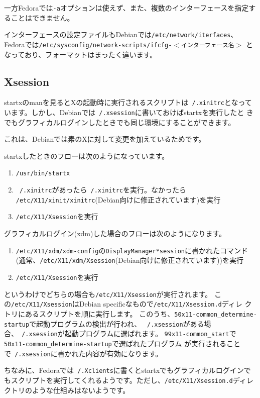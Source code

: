 \documentclass[mingoth,a4paper]{jsarticle}
\begin{document}
一方Fedoraでは\texttt{-a}オプションは使えず、また、複数のインターフェースを指定す
ることはできません。

インターフェースの設定ファイルもDebianでは\texttt{/etc/network/iterfaces}、
Fedoraでは\texttt{/etc/sysconfig/network-scripts/ifcfg-$<$インターフェース名$>$}
となっており、フォーマットはまったく違います。

\subsection{Xsession}

startxのmanを見るとXの起動時に実行されるスクリプトは\texttt{~/.xinitrc}となって
います。しかし、Debianでは\texttt{~/.xsession}に書いておけばstartxを実行したと
きでもグラフィカルログインしたときでも同じ環境にすることができます。

これは、Debianでは素のXに対して変更を加えているためです。

startxしたときのフローは次のようになっています。
\begin{enumerate}
\item \texttt{/usr/bin/startx}
\item \texttt{~/.xinitrc}があったら\texttt{~/.xinitrc}を実行。なかったら
	  \texttt{/etc/X11/xinit/xinitrc}(Debian向けに修正されています)を実行
\item \texttt{/etc/X11/Xsession}を実行
\end{enumerate}

グラフィカルログイン(xdm)した場合のフローは次のようになります。
\begin{enumerate}
\item \texttt{/etc/X11/xdm/xdm-config}の\texttt{DisplayManager*session}に書かれたコマンド
	  (通常、\texttt{/etc/X11/xdm/Xsession}(Debian向けに修正されています))を実行
\item \texttt{/etc/X11/Xsession}を実行
\end{enumerate}

というわけでどちらの場合も\texttt{/etc/X11/Xsession}が実行されます。
この\texttt{/etc/X11/Xsession}はDebian specificなもので\texttt{/etc/X11/Xsession.d}ディレ
クトリにあるスクリプトを順に実行します。
このうち、\texttt{50x11-common\_determine-startup}で起動プログラムの検出が行われ、
\texttt{~/.xsession}がある場合、\texttt{~/.xsession}が起動プログラムに選ばれます。
\texttt{99x11-common\_start}で\texttt{50x11-common\_determine-startup}で選ばれたプログラム
が実行されることで\texttt{~/.xsession}に書かれた内容が有効になります。

ちなみに、Fedoraでは\texttt{~/.Xclients}に書くとstartxでもグラフィカルログインで
もスクリプトを実行してくれるようです。ただし、\texttt{/etc/X11/Xsession.d}ディレ
クトリのような仕組みはないようです。
\end{document}
